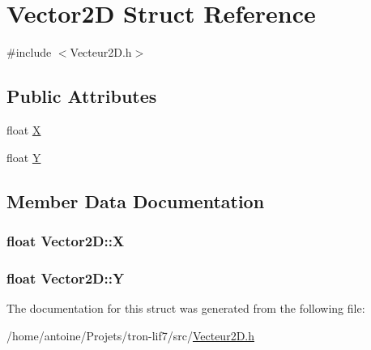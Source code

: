 \hypertarget{structVector2D}{\section{Vector2\-D Struct Reference}
\label{structVector2D}
}


{\ttfamily \#include $<$Vecteur2\-D.\-h$>$}

\subsection*{Public Attributes}
\begin{DoxyCompactItemize}
\item 
float \hyperlink{structVector2D_ad5053de07ddfbb1d38b55fce7f271ff5}{X}
\item 
float \hyperlink{structVector2D_adad18acabf7238660d50f5e9ceb01c7c}{Y}
\end{DoxyCompactItemize}


\subsection{Member Data Documentation}
\hypertarget{structVector2D_ad5053de07ddfbb1d38b55fce7f271ff5}{
\subsubsection[{X}]{\setlength{\rightskip}{0pt plus 5cm}float Vector2\-D\-::\-X}}\label{structVector2D_ad5053de07ddfbb1d38b55fce7f271ff5}
\hypertarget{structVector2D_adad18acabf7238660d50f5e9ceb01c7c}{
\subsubsection[{Y}]{\setlength{\rightskip}{0pt plus 5cm}float Vector2\-D\-::\-Y}}\label{structVector2D_adad18acabf7238660d50f5e9ceb01c7c}


The documentation for this struct was generated from the following file\-:\begin{DoxyCompactItemize}
\item 
/home/antoine/\-Projets/tron-\/lif7/src/\hyperlink{Vecteur2D_8h}{Vecteur2\-D.\-h}\end{DoxyCompactItemize}
